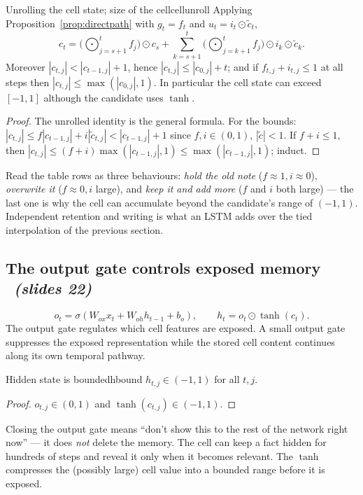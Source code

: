 \documentclass[11pt,a4paper]{article}
\newcommand{\tc}{\tilde c}
\newcommand{\sltag}[1]{\texorpdfstring{\ \emph{(slides #1)}}{ (slides #1)}}
\begin{document}
\begin{proposition}{Unrolling the cell state; size of the cell}{cellunroll}
Applying Proposition~\ref{prop:directpath} with $g_t=f_t$ and $u_t=i_t\odot\tc_t$,
\[
c_t=\Big(\textstyle\bigodot_{j=s+1}^{t}f_j\Big)\odot c_s+\sum_{k=s+1}^{t}\Big(\textstyle\bigodot_{j=k+1}^{t}f_j\Big)\odot i_k\odot\tc_k .
\]
Moreover $|c_{t,j}|<|c_{t-1,j}|+1$, hence $|c_{t,j}|\le|c_{0,j}|+t$; and if $f_{t,j}+i_{t,j}\le1$ at all steps then $|c_{t,j}|\le\max(|c_{0,j}|,1)$. In particular the cell state can exceed $[-1,1]$ although the candidate uses $\tanh$.
\end{proposition}
\begin{proof}
The unrolled identity is the general formula. For the bounds: $|c_{t,j}|\le f|c_{t-1,j}|+i|\tc_{t,j}|<|c_{t-1,j}|+1$ since $f,i\in(0,1)$, $|\tc|<1$. If $f+i\le1$, then $|c_{t,j}|\le (f+i)\max(|c_{t-1,j}|,1)\le\max(|c_{t-1,j}|,1)$; induct.
\end{proof}

\begin{intuition}
Read the table rows as three behaviours: \emph{hold the old note} ($f\approx1,i\approx0$), \emph{overwrite it} ($f\approx0,i$ large), and \emph{keep it and add more} ($f$ and $i$ both large) --- the last one is why the cell can accumulate beyond the candidate's range of $(-1,1)$. Independent retention and writing is what an LSTM adds over the tied interpolation of the previous section.
\end{intuition}

\subsection{The output gate controls exposed memory \sltag{22}}

\[
o_t=\sigma(W_{ox}x_t+W_{oh}h_{t-1}+b_o),\qquad h_t=o_t\odot\tanh(c_t).
\]
The output gate regulates which cell features are exposed. A small output gate suppresses the exposed representation while the stored cell content continues along its own temporal pathway.

\begin{proposition}{Hidden state is bounded}{hbound}
$h_{t,j}\in(-1,1)$ for all $t,j$.
\end{proposition}
\begin{proof}
$o_{t,j}\in(0,1)$ and $\tanh(c_{t,j})\in(-1,1)$.
\end{proof}

\begin{intuition}
Closing the output gate means ``don't show this to the rest of the network right now'' --- it does \emph{not} delete the memory. The cell can keep a fact hidden for hundreds of steps and reveal it only when it becomes relevant. The $\tanh$ compresses the (possibly large) cell value into a bounded range before it is exposed.
\end{intuition}
\end{document}
